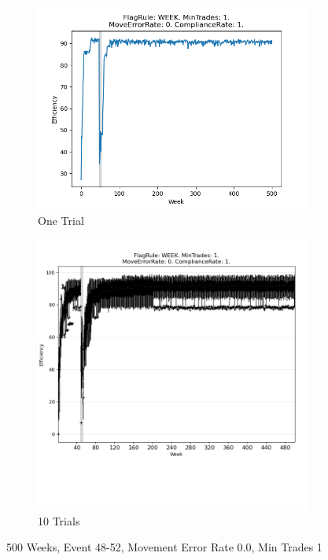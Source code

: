 \documentclass{article}%
\begin{document}
%


\begin{figure}[!htb]%
\begin{subfigure}[b]{0.45\linewidth}%
\includegraphics[width=\linewidth]{1028fr_WEEK_mt_1_er_0_cr_1_t1.png}%
\caption{One Trial}%
\end{subfigure}%
\begin{subfigure}[b]{0.45\linewidth}%
\includegraphics[clip,width=\linewidth,trim=0 4cm 0 0]{1028fr_WEEK_mt_1_er_0_cr_1_t10.png}%
\caption{10 Trials}%
\end{subfigure}%
\caption{500 Weeks, Event 48{-}52, Movement Error Rate 0.0, Min Trades 1}%
\end{figure}
\end{document}
